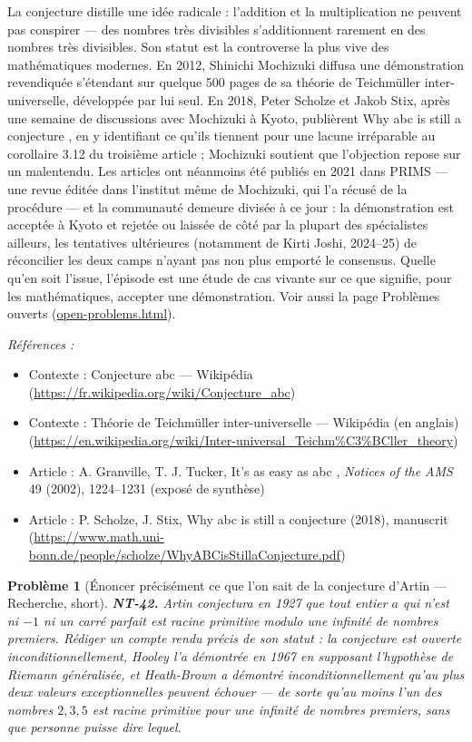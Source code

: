 \documentclass[11pt]{article}
\newtheorem{problem}{Problème}
\newenvironment{refs}{\par\small\noindent\emph{Références :}\begin{itemize}\setlength\itemsep{0pt}}{\end{itemize}\normalsize}
\begin{document}
\noindent La conjecture distille une idée radicale : l'addition et la multiplication
ne peuvent pas conspirer --- des nombres très divisibles s'additionnent rarement en des nombres très
divisibles. Son statut est la controverse la plus vive des mathématiques modernes. En 2012, Shinichi
Mochizuki diffusa une démonstration revendiquée s'étendant sur quelque 500 pages de sa théorie de
Teichmüller inter-universelle, développée par lui seul. En 2018, Peter Scholze et Jakob Stix, après
une semaine de discussions avec Mochizuki à Kyoto, publièrent \og{} Why abc is still a conjecture \fg{}, en y
identifiant ce qu'ils tiennent pour une lacune irréparable au corollaire 3.12 du troisième article ;
Mochizuki soutient que l'objection repose sur un malentendu. Les articles ont néanmoins été
publiés en 2021 dans PRIMS --- une revue éditée dans l'institut même de Mochizuki, qui l'a récusé de la
procédure --- et la communauté demeure divisée à ce jour : la démonstration est acceptée à Kyoto et
rejetée ou laissée de côté par la plupart des spécialistes ailleurs, les tentatives ultérieures
(notamment de Kirti Joshi, 2024--25) de réconcilier les deux camps n'ayant pas non plus emporté le
consensus. Quelle qu'en soit l'issue, l'épisode est une étude de cas vivante sur ce que signifie,
pour les mathématiques, accepter une démonstration. Voir aussi la page
Problèmes ouverts (\url{open-problems.html}).

\begin{refs}
\item Contexte : Conjecture abc --- Wikipédia (\url{https://fr.wikipedia.org/wiki/Conjecture_abc})
\item Contexte : Théorie de Teichmüller inter-universelle --- Wikipédia (en anglais) (\url{https://en.wikipedia.org/wiki/Inter-universal_Teichm%C3%BCller_theory})
\item Article : A. Granville, T. J. Tucker, \og{} It's as easy as abc \fg{}, \textit{Notices of the AMS} 49 (2002), 1224--1231 (exposé de synthèse)
\item Article : P. Scholze, J. Stix, \og{} Why abc is still a conjecture \fg{} (2018), manuscrit (\url{https://www.math.uni-bonn.de/people/scholze/WhyABCisStillaConjecture.pdf})
\end{refs}

\bigskip

\begin{problem}[{Énoncer précisément ce que l'on sait de la conjecture d'Artin --- Recherche, short}]
\textbf{NT-42.} Artin conjectura en 1927 que tout entier $ a $ qui n'est ni $ -1 $ ni un carré parfait est racine primitive modulo une infinité de nombres premiers. Rédiger un compte rendu précis de son statut : la conjecture est ouverte inconditionnellement, Hooley l'a démontrée en 1967 en supposant l'hypothèse de Riemann généralisée, et Heath-Brown a démontré inconditionnellement qu'au plus deux valeurs exceptionnelles peuvent échouer --- de sorte qu'au moins l'un des nombres $ 2, 3, 5 $ est racine primitive pour une infinité de nombres premiers, sans que personne puisse dire lequel.
\end{problem}
\end{document}
